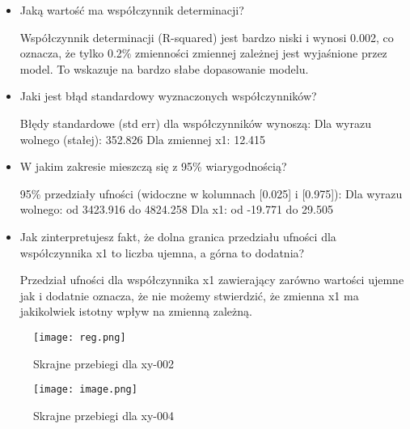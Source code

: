 \documentclass{article}
\begin{document}
\begin{itemize}
    \item  Jaką wartość ma współczynnik determinacji?
    
Współczynnik determinacji (R-squared) jest bardzo niski i wynosi 0.002, co oznacza, że tylko 0.2\% zmienności zmiennej zależnej jest wyjaśnione przez model. To wskazuje na bardzo słabe dopasowanie modelu.

    \item Jaki jest błąd standardowy wyznaczonych współczynników?
    
Błędy standardowe (std err) dla współczynników wynoszą:
    Dla wyrazu wolnego (stałej): 352.826
    Dla zmiennej x1: 12.415

    \item W jakim zakresie mieszczą się z 95\% wiarygodnością?
    
95\% przedziały ufności (widoczne w kolumnach [0.025] i [0.975]):
    Dla wyrazu wolnego: od 3423.916 do 4824.258
    Dla x1: od -19.771 do 29.505

    \item Jak zinterpretujesz fakt, że dolna granica przedziału ufności dla współczynnika x1 to liczba ujemna, a górna to dodatnia?

Przedział ufności dla współczynnika x1 zawierający zarówno wartości ujemne jak i dodatnie oznacza, że nie możemy stwierdzić, że zmienna x1 ma jakikolwiek istotny wpływ na zmienną zależną.

\end{itemize}

\begin{figure}[H]
    \centering
    \begin{minipage}{0.45\textwidth}
        \texttt{[image: reg.png]}
        \caption{Skrajne przebiegi dla xy-002}
    \end{minipage}
    \hfill
    \begin{minipage}{0.45\textwidth}
        \texttt{[image: image.png]}
        \caption{Skrajne przebiegi dla xy-004}
    \end{minipage}
\end{figure}
\end{document}
